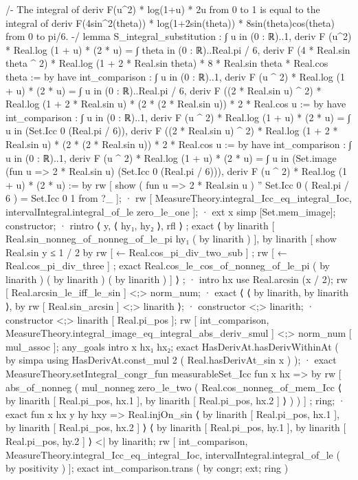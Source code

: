 /-
The integral of deriv F(u^2) * log(1+u) * 2u from 0 to 1 is equal to the integral of deriv F(4sin^2(theta)) * log(1+2sin(theta)) * 8sin(theta)cos(theta) from 0 to pi/6.
-/
lemma S_integral_substitution :
  ∫ u in (0 : ℝ)..1, deriv F (u^2) * Real.log (1 + u) * (2 * u) =
  ∫ theta in (0 : ℝ)..Real.pi / 6, deriv F (4 * Real.sin theta ^ 2) * Real.log (1 + 2 * Real.sin theta) * 8 * Real.sin theta * Real.cos theta := by
    have int_comparison : ∫ u in (0 : ℝ)..1, deriv F (u ^ 2) * Real.log (1 + u) * (2 * u) = ∫ u in (0 : ℝ)..Real.pi / 6, deriv F ((2 * Real.sin u) ^ 2) * Real.log (1 + 2 * Real.sin u) * (2 * (2 * Real.sin u)) * 2 * Real.cos u := by
      have int_comparison : ∫ u in (0 : ℝ)..1, deriv F (u ^ 2) * Real.log (1 + u) * (2 * u) = ∫ u in (Set.Icc 0 (Real.pi / 6)), deriv F ((2 * Real.sin u) ^ 2) * Real.log (1 + 2 * Real.sin u) * (2 * (2 * Real.sin u)) * 2 * Real.cos u := by
        have int_comparison : ∫ u in (0 : ℝ)..1, deriv F (u ^ 2) * Real.log (1 + u) * (2 * u) = ∫ u in (Set.image (fun u => 2 * Real.sin u) (Set.Icc 0 (Real.pi / 6))), deriv F (u ^ 2) * Real.log (1 + u) * (2 * u) := by
          rw [ show ( fun u => 2 * Real.sin u ) '' Set.Icc 0 ( Real.pi / 6 ) = Set.Icc 0 1 from ?_ ];
          · rw [ MeasureTheory.integral_Icc_eq_integral_Ioc, intervalIntegral.integral_of_le zero_le_one ];
          · ext x
            simp [Set.mem_image];
            constructor;
            · rintro ⟨ y, ⟨ hy₁, hy₂ ⟩, rfl ⟩ ; exact ⟨ by linarith [ Real.sin_nonneg_of_nonneg_of_le_pi hy₁ ( by linarith ) ], by linarith [ show Real.sin y ≤ 1 / 2 by rw [ ← Real.cos_pi_div_two_sub ] ; rw [ ← Real.cos_pi_div_three ] ; exact Real.cos_le_cos_of_nonneg_of_le_pi ( by linarith ) ( by linarith ) ( by linarith ) ] ⟩ ;
            · intro hx
              use Real.arcsin (x / 2);
              rw [ Real.arcsin_le_iff_le_sin ] <;> norm_num;
              · exact ⟨ ⟨ by linarith, by linarith ⟩, by rw [ Real.sin_arcsin ] <;> linarith ⟩;
              · constructor <;> linarith;
              · constructor <;> linarith [ Real.pi_pos ];
        rw [ int_comparison, MeasureTheory.integral_image_eq_integral_abs_deriv_smul ] <;> norm_num [ mul_assoc ];
        any_goals intro x hx₁ hx₂; exact HasDerivAt.hasDerivWithinAt ( by simpa using HasDerivAt.const_mul 2 ( Real.hasDerivAt_sin x ) );
        · exact MeasureTheory.setIntegral_congr_fun measurableSet_Icc fun x hx => by rw [ abs_of_nonneg ( mul_nonneg zero_le_two ( Real.cos_nonneg_of_mem_Icc ⟨ by linarith [ Real.pi_pos, hx.1 ], by linarith [ Real.pi_pos, hx.2 ] ⟩ ) ) ] ; ring;
        · exact fun x hx y hy hxy => Real.injOn_sin ⟨ by linarith [ Real.pi_pos, hx.1 ], by linarith [ Real.pi_pos, hx.2 ] ⟩ ⟨ by linarith [ Real.pi_pos, hy.1 ], by linarith [ Real.pi_pos, hy.2 ] ⟩ <| by linarith;
      rw [ int_comparison, MeasureTheory.integral_Icc_eq_integral_Ioc, intervalIntegral.integral_of_le ( by positivity ) ];
    exact int_comparison.trans ( by congr; ext; ring )

